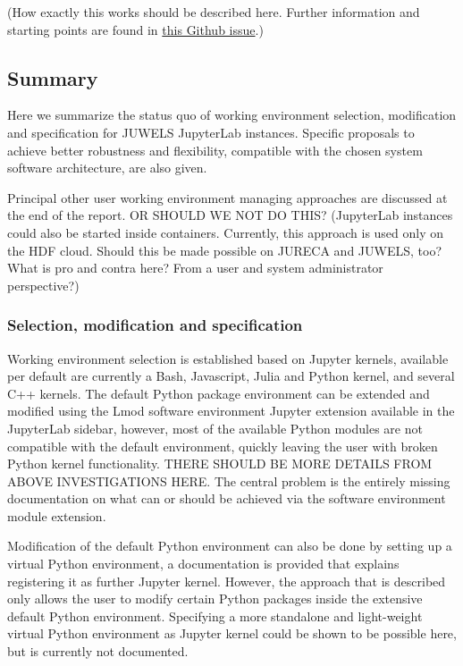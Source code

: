 \documentclass[11pt,a4paper]{article}
\begin{document}
(How exactly this works should be described here. Further information and starting points are found in \href{https://github.com/ExaESM-WP4/JupyterHub-Evaluation-Whitepaper/issues/6}{this Github issue}.)

\subsection{Summary}
\label{sect:working-envs:summary}

Here we summarize the status quo of working environment selection, modification and specification for JUWELS JupyterLab instances.
Specific proposals to achieve better robustness and flexibility, compatible with the chosen system software architecture, are also given.

Principal other user working environment managing approaches are discussed at the end of the report. OR SHOULD WE NOT DO THIS? (JupyterLab instances could also be started inside containers. Currently, this approach is used only on the HDF cloud. Should this be made possible on JURECA and JUWELS, too? What is pro and contra here? From a user and system administrator perspective?)

\subsubsection{Selection, modification and specification}

Working environment selection is established based on Jupyter kernels, available per default are currently a Bash, Javascript, Julia and Python kernel, and several C++ kernels.
The default Python package environment can be extended and modified using the Lmod software environment Jupyter extension available in the JupyterLab sidebar, however, most of the available Python modules are not compatible with the default environment, quickly leaving the user with broken Python kernel functionality.
THERE SHOULD BE MORE DETAILS FROM ABOVE INVESTIGATIONS HERE.
The central problem is the entirely missing documentation on what can or should be achieved via the software environment module extension.

Modification of the default Python environment can also be done by setting up a virtual Python environment, a documentation is provided that explains registering it as further Jupyter kernel.
However, the approach that is described only allows the user to modify certain Python packages inside the extensive default Python environment.
Specifying a more standalone and light-weight virtual Python environment as Jupyter kernel could be shown to be possible here, but is currently not documented.
\end{document}
